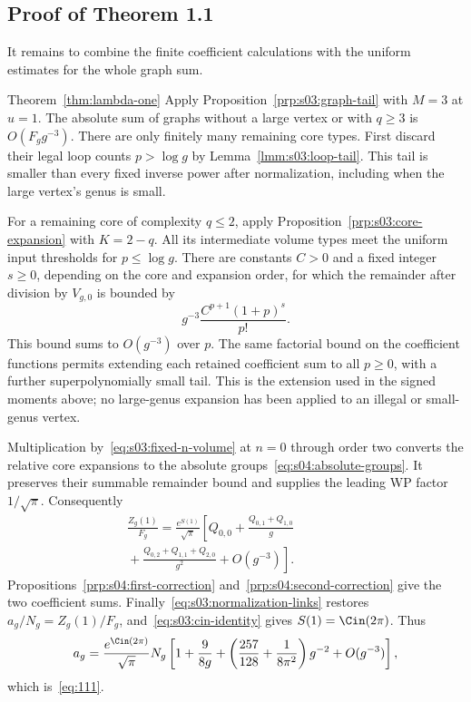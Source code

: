 \subsection{Proof of Theorem 1.1}
\label{subsec:s04:04}

It remains to combine the finite coefficient calculations with the
uniform estimates for the whole graph sum.

\begin{prfn}{Theorem~\ref{thm:lambda-one}}
Apply Proposition~\ref{prp:s03:graph-tail} with $M=3$ at $u=1$.
The absolute sum of graphs without a large vertex or with $q\geq3$
is $O(F_g g^{-3})$. There are only finitely many remaining core
types. First discard their legal loop counts $p>\log g$ by
Lemma~\ref{lmm:s03:loop-tail}. This tail is smaller than every fixed
inverse power after normalization, including when the large vertex's
genus is small.

For a remaining core of complexity $q\leq2$, apply
Proposition~\ref{prp:s03:core-expansion} with $K=2-q$.
All its intermediate volume types meet the uniform input thresholds
for $p\leq\log g$. There are constants $C>0$ and a fixed integer
$s\geq0$, depending on the core and expansion order, for which the
remainder after division by $V_{g,0}$ is bounded by
\[
 g^{-3}\frac{C^{p+1}(1+p)^s}{p!}.
\]
This bound sums to $O(g^{-3})$ over $p$.
The same factorial bound on the coefficient functions permits
extending each retained coefficient sum to all $p\geq0$, with a
further superpolynomially small tail. This is the extension used in
the signed moments above; no large-genus expansion has been applied
to an illegal or small-genus vertex.

Multiplication by~\eqref{eq:s03:fixed-n-volume} at $n=0$ through
order two converts the relative core expansions to the absolute
groups~\eqref{eq:s04:absolute-groups}. It preserves their summable
remainder bound and supplies the leading WP factor $1/\sqrt\pi$.
Consequently
\begin{align*}
 \frac{Z_g(1)}{F_g}=\frac{e^{S(1)}}{\sqrt\pi}
 \left[Q_{0,0}+\frac{Q_{0,1}+Q_{1,0}}g\right.\qquad\qquad\\
 \left.{}+\frac{Q_{0,2}+Q_{1,1}+Q_{2,0}}{g^2}
                  +O(g^{-3})\right].
\end{align*}
Propositions~\ref{prp:s04:first-correction}
and~\ref{prp:s04:second-correction} give the two coefficient sums.
Finally~\eqref{eq:s03:normalization-links} restores
$a_g/N_g=Z_g(1)/F_g$, and~\eqref{eq:s03:cin-identity} gives
$S(1)=\Cin(2\pi)$. Thus
\[
 a_g=\frac{e^{\Cin(2\pi)}}{\sqrt\pi}N_g
 \left[1+\frac9{8g}
     +\left(\frac{257}{128}+\frac1{8\pi^2}\right)g^{-2}
     +O(g^{-3})\right],
\]
which is~\eqref{eq:111}.
\end{prfn}

